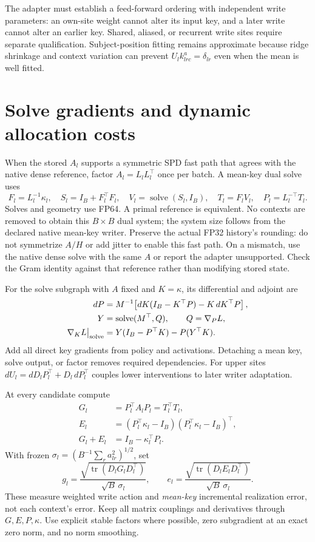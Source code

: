 \documentclass[10pt]{article}
\newcommand{\tr}{\operatorname{tr}}
\begin{document}
The adapter must establish a feed-forward ordering with independent
write parameters: an own-site weight cannot alter its input key, and a
later write cannot alter an earlier key. Shared, aliased, or recurrent
write sites require separate qualification. Subject-position fitting
remains approximate because ridge shrinkage and context variation can
prevent $U_lk_{lrc}^a=\delta_{lr}$ even when the mean is well fitted.

\newpage
\section{Solve gradients and dynamic allocation costs}
When the stored $A_l$ supports a symmetric SPD fast path that agrees
with the native dense reference, factor $A_l=L_lL_l^\top$ once per batch.
A mean-key dual solve uses
\[
 F_l=L_l^{-1}\kappa_l,\quad S_l=I_B+F_l^\top F_l,\quad
 V_l=\operatorname{solve}(S_l,I_B),\quad
 T_l=F_lV_l,\quad P_l=L_l^{-\top}T_l.
\]
Solves and geometry use FP64. A primal reference is equivalent. No
contexts are removed to obtain this $B\times B$ dual system; the system
size follows from the declared native mean-key writer.
Preserve the actual FP32 history's rounding: do not symmetrize $A/H$ or
add jitter to enable this fast path. On a mismatch, use the native dense
solve with the same $A$ or report the adapter unsupported. Check the
Gram identity against that reference rather than modifying stored state.

For the solve subgraph with $A$ fixed and $K=\kappa$, its differential
and adjoint are
\begin{align}
 dP&=M^{-1}\!\left[dK(I_B-K^\top P)-K\,dK^\top P\right],\\
 Y&=\operatorname{solve}(M^\top,Q),\qquad Q=\nabla_P L,\\
 \nabla_K L\big|_{\rm solve}
 &=Y(I_B-P^\top K)-P(Y^\top K).
\end{align}
Add all direct key gradients from policy and activations. Detaching a
mean key, solve output, or factor removes required dependencies. For
upper sites $dU_l=dD_lP_l^\top+D_l\,dP_l^\top$ couples lower interventions
to later writer adaptation.

At every candidate compute
\begin{align}
 G_l&=P_l^\top A_lP_l=T_l^\top T_l,\\
 E_l&=(P_l^\top\kappa_l-I_B)(P_l^\top\kappa_l-I_B)^\top,\\
 G_l+E_l&=I_B-\kappa_l^\top P_l.
\end{align}
With frozen $\sigma_l=(B^{-1}\sum_ra_{lr}^2)^{1/2}$, set
\[
 g_l=\frac{\sqrt{\tr(D_lG_lD_l^\top)}}{\sqrt B\,\sigma_l},\qquad
 e_l=\frac{\sqrt{\tr(D_lE_lD_l^\top)}}{\sqrt B\,\sigma_l}.
\]
These measure weighted write action and \emph{mean-key} incremental
realization error, not each context's error. Keep all matrix couplings
and derivatives through $G,E,P,\kappa$. Use explicit stable factors where
possible, zero subgradient at an exact zero norm, and no norm smoothing.
\end{document}
